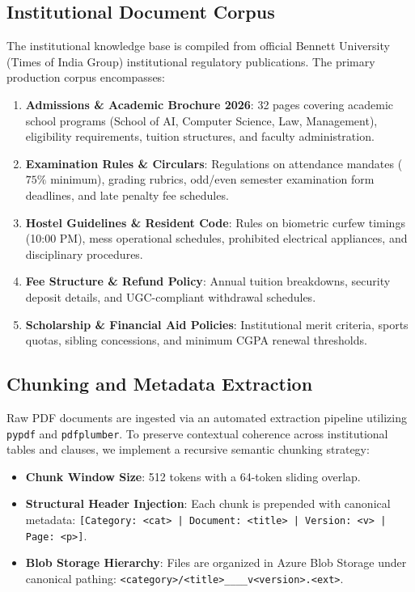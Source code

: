 \documentclass[conference]{IEEEtran}
\begin{document}
\subsection{Institutional Document Corpus}
The institutional knowledge base is compiled from official Bennett University (Times of India Group) institutional regulatory publications. The primary production corpus encompasses:
\begin{enumerate}
    \item \textbf{Admissions \& Academic Brochure 2026}: 32 pages covering academic school programs (School of AI, Computer Science, Law, Management), eligibility requirements, tuition structures, and faculty administration.
    \item \textbf{Examination Rules \& Circulars}: Regulations on attendance mandates ($75\%$ minimum), grading rubrics, odd/even semester examination form deadlines, and late penalty fee schedules.
    \item \textbf{Hostel Guidelines \& Resident Code}: Rules on biometric curfew timings (10:00 PM), mess operational schedules, prohibited electrical appliances, and disciplinary procedures.
    \item \textbf{Fee Structure \& Refund Policy}: Annual tuition breakdowns, security deposit details, and UGC-compliant withdrawal schedules.
    \item \textbf{Scholarship \& Financial Aid Policies}: Institutional merit criteria, sports quotas, sibling concessions, and minimum CGPA renewal thresholds.
\end{enumerate}

\subsection{Chunking and Metadata Extraction}
Raw PDF documents are ingested via an automated extraction pipeline utilizing \texttt{pypdf} and \texttt{pdfplumber}. To preserve contextual coherence across institutional tables and clauses, we implement a recursive semantic chunking strategy:
\begin{itemize}
    \item \textbf{Chunk Window Size}: 512 tokens with a 64-token sliding overlap.
    \item \textbf{Structural Header Injection}: Each chunk is prepended with canonical metadata:
    \texttt{[Category: <cat> | Document: <title> | Version: <v> | Page: <p>]}.
    \item \textbf{Blob Storage Hierarchy}: Files are organized in Azure Blob Storage under canonical pathing:
    \texttt{<category>/<title>\_\_<YYYY-MM-DD>\_\_v<version>.<ext>}.
\end{itemize}
\end{document}
